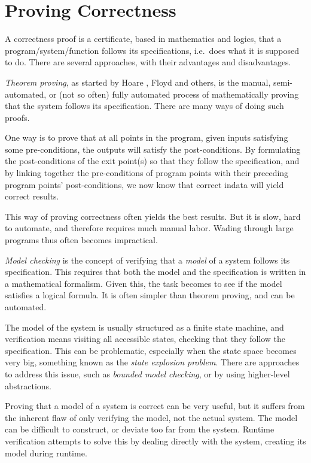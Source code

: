 \documentclass[a4paper,11pt]{kth-mag}
\begin{document}
\section{Proving Correctness} \label{section-proving-correctness}

A correctness proof is a certificate, based in mathematics and logics, that a
program/system/function follows its specifications, i.e.\ does what it is
supposed to do. There are several approaches, with their advantages and
disadvantages.

\textit{Theorem proving}, as started by Hoare \cite{hoare69}, Floyd
\cite{floyd67} and others, is the manual, semi-automated, or (not so often)
fully automated process of mathematically proving that the system follows its
specification. There are many ways of doing such proofs.

One way is to prove that at all points in the program, given inputs satisfying
some pre-conditions, the outputs will satisfy the post-conditions. By
formulating the post-conditions of the exit point(s) so that they follow the
specification, and by linking together the pre-conditions of program points
with their preceding program points' post-conditions, we now know that correct
indata will yield correct results.

This way of proving correctness often yields the best results. But it is slow,
hard to automate, and therefore requires much manual labor. Wading through
large programs thus often becomes impractical.

\textit{Model checking} is the concept of verifying that a \textit{model} of a
system follows its specification. This requires that both the model and the
specification is written in a mathematical formalism. Given this, the task
becomes to see if the model satisfies a logical formula. It is often simpler
than theorem proving, and can be automated.

The model of the system is usually structured as a finite state machine, and
verification means visiting all accessible states, checking that they follow
the specification. This can be problematic, especially when the state space
becomes very big, something known as the \textit{state explosion problem}.
There are approaches to address this issue, such as \textit{bounded model
checking}, or by using higher-level abstractions.

Proving that a model of a system is correct can be very useful, but it suffers
from the inherent flaw of only verifying the model, not the actual system. The
model can be difficult to construct, or deviate too far from the system.
Runtime verification attempts to solve this by dealing directly with the
system, creating its model during runtime.
\end{document}
